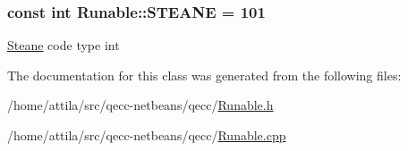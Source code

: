 \subsubsection[{\texorpdfstring{S\+T\+E\+A\+NE}{STEANE}}]{\setlength{\rightskip}{0pt plus 5cm}const int Runable\+::\+S\+T\+E\+A\+NE = 101\hspace{0.3cm}{\ttfamily [static]}}\hypertarget{class_runable_a68af748dc3edebef5e1dd7a3e18a1b5f}{}\label{class_runable_a68af748dc3edebef5e1dd7a3e18a1b5f}
\hyperlink{class_steane}{Steane} code type int 

The documentation for this class was generated from the following files\+:\begin{DoxyCompactItemize}
\item 
/home/attila/src/qecc-\/netbeans/qecc/\hyperlink{_runable_8h}{Runable.\+h}\item 
/home/attila/src/qecc-\/netbeans/qecc/\hyperlink{_runable_8cpp}{Runable.\+cpp}\end{DoxyCompactItemize}
